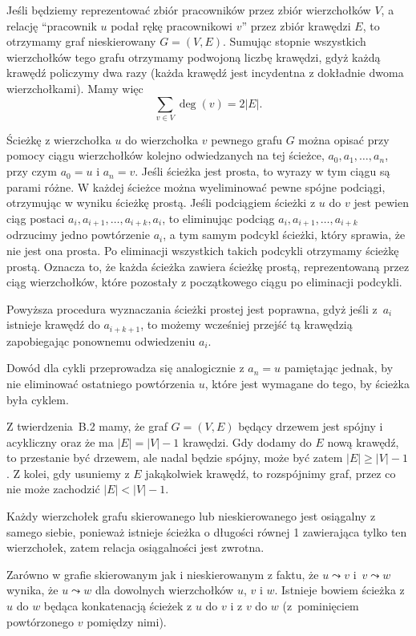 
\exercise %
Jeśli będziemy reprezentować zbiór pracowników przez zbiór wierzchołków $V$, a relację ``pracownik $u$ podał rękę pracownikowi $v$'' przez zbiór krawędzi $E$, to otrzymamy graf nieskierowany $G=(V,E)$. Sumując stopnie wszystkich wierzchołków tego grafu otrzymamy podwojoną liczbę krawędzi, gdyż każdą krawędź policzymy dwa razy (każda krawędź jest incydentna z dokładnie dwoma wierzchołkami). Mamy więc
\[
	\sum_{v\in V}\deg(v) = 2|E|.
\]

\exercise %
Ścieżkę z wierzchołka $u$ do wierzchołka $v$ pewnego grafu $G$ można opisać przy pomocy ciągu wierzchołków kolejno odwiedzanych na tej ścieżce, $a_0,a_1,\dots,a_n$, przy czym $a_0=u$ i $a_n=v$. Jeśli ścieżka jest prosta, to wyrazy w tym ciągu są parami różne. W każdej ścieżce można wyeliminować pewne spójne podciągi, otrzymując w wyniku ścieżkę prostą. Jeśli podciągiem ścieżki z $u$ do $v$ jest pewien ciąg postaci $a_i,a_{i+1},\dots,a_{i+k},a_i$, to eliminując podciąg $a_i,a_{i+1},\dots,a_{i+k}$ odrzucimy jedno powtórzenie $a_i$, a tym samym podcykl ścieżki, który sprawia, że nie jest ona prosta. Po eliminacji wszystkich takich podcykli otrzymamy ścieżkę prostą. Oznacza to, że każda ścieżka zawiera ścieżkę prostą, reprezentowaną przez ciąg wierzchołków, które pozostały z początkowego ciągu po eliminacji podcykli.

Powyższa procedura wyznaczania ścieżki prostej jest poprawna, gdyż jeśli z~$a_i$ istnieje krawędź do $a_{i+k+1}$, to możemy wcześniej przejść tą krawędzią zapobiegając ponownemu odwiedzeniu $a_i$.

Dowód dla cykli przeprowadza się analogicznie z $a_n=u$ pamiętając jednak, by nie eliminować ostatniego powtórzenia $u$, które jest wymagane do tego, by ścieżka była cyklem.

\exercise %
Z twierdzenia~B.2 mamy, że graf $G=(V,E)$ będący drzewem jest spójny i acykliczny oraz że ma $|E|=|V|-1$ krawędzi. Gdy dodamy do $E$ nową krawędź, to przestanie być drzewem, ale nadal będzie spójny, może być zatem $|E|\ge|V|-1$. Z kolei, gdy usuniemy z $E$ jakąkolwiek krawędź, to rozspójnimy graf, przez co nie może zachodzić $|E|<|V|-1$.

\exercise %
Każdy wierzchołek grafu skierowanego lub nieskierowanego jest osiągalny z samego siebie, ponieważ istnieje ścieżka o długości równej 1 zawierająca tylko ten wierzchołek, zatem relacja osiągalności jest zwrotna.

Zarówno w grafie skierowanym jak i nieskierowanym z faktu, że $u\leadsto v$ i~$v\leadsto w$ wynika, że $u\leadsto w$ dla dowolnych wierzchołków $u$, $v$ i $w$. Istnieje bowiem ścieżka z $u$ do $w$ będąca konkatenacją ścieżek z $u$ do $v$ i z $v$ do $w$ (z~pominięciem powtórzonego $v$ pomiędzy nimi).

